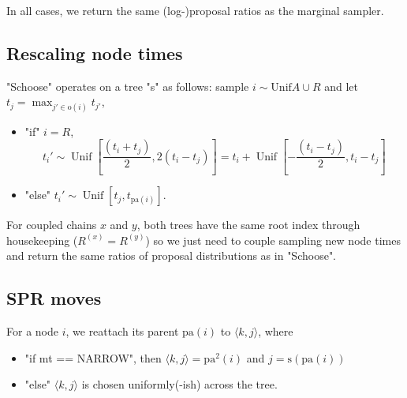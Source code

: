 \documentclass[11pt,a4paper]{article}
\newcommand{\edge}[2]{\langle#1, #2\rangle}
\newcommand{\pa}{\mathrm{pa}}
\newcommand{\sib}{\mathrm{s}}
\newcommand{\off}{\mathrm{o}}
\DeclareMathOperator*{\Unif}{\mathrm{Unif}}
\begin{document}
In all cases, we return the same (log-)proposal ratios as the marginal sampler.

\subsection*{Rescaling node times}



"Schoose" operates on a tree "s" as follows: sample $ i \sim \mathrm{Unif}{A \cup R} $ and let $ t_j = \max_{j' \in \off(i)} t_{j'} $,
\begin{itemize}
    \item "if" $ i = R $,
    \[
        t_i' \sim \Unif\left[\frac{(t_i + t_j)}{2}, 2(t_i - t_j)\right]
            = t_i + \Unif\left[-\frac{(t_i - t_j)}{2}, t_i - t_j\right]
    \]
    \item "else" $ t_i' \sim \Unif[t_j, t_{\pa(i)}] $.
\end{itemize}
For coupled chains $ x $ and $ y $, both trees have the same root index through housekeeping ($ R^{(x)} =  R^{(y)} $) so we just need to couple sampling new node times and return the same ratios of proposal distributions as in "Schoose".



\subsection*{SPR moves}

For a node $ i $, we reattach its parent $ \pa(i) $ to $ \edge{k}{j} $, where
\begin{itemize}
    \item "if mt == NARROW", then $ \edge{k}{j} = \pa^2(i) $ and $ j = \sib(\pa(i)) $
    \item "else" $ \edge{k}{j} $ is chosen uniformly(-ish) across the tree.
\end{itemize}


\end{document}
